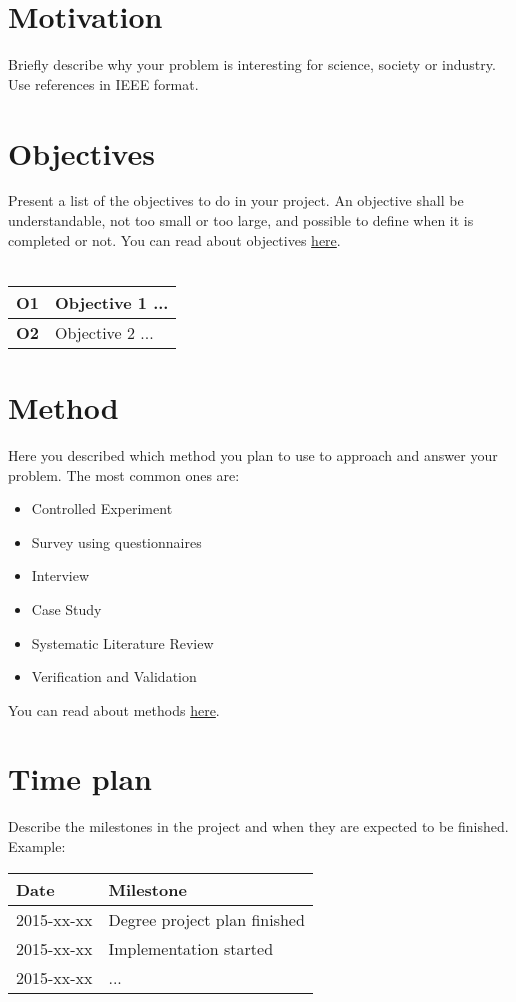 \documentclass[12pt]{article}
\begin{document}
\section*{Motivation}
Briefly describe why your problem is interesting for science, society or industry. Use references in IEEE format\cite{Chalmers:2013,Darwin:1859}.

\section*{Objectives}
Present a list of the objectives to do in your project. An objective shall be understandable, not too small or too large, and possible to define when it is completed or not. You can read about objectives \href{https://coursepress.lnu.se/subject/thesis-projects/objectives/}{here}.\\
\\
\begin{tabular} {|p{1.2cm}|p{11.6cm}|} \hline
\textbf{O1} & Objective 1 ... \\ \hline
\textbf{O2} & Objective 2 ... \\ \hline
\end{tabular}

\section*{Method}
Here you described which method you plan to use to approach and answer your problem. The most common ones are:
\begin{itemize}
\item Controlled Experiment
\item Survey using questionnaires
\item Interview
\item Case Study
\item Systematic Literature Review
\item Verification and Validation 
\end{itemize}

You can read about methods \href{https://coursepress.lnu.se/subject/thesis-projects/method-overview/}{here}.

\section*{Time plan}
Describe the milestones in the project and when they are expected to be finished. Example:
\\
\begin{tabular} {|p{2.6cm}|p{10.2cm}|} \hline
\textbf{Date} & \textbf{Milestone} \\ \hline
2015-xx-xx & Degree project plan finished \\ \hline
2015-xx-xx & Implementation started \\ \hline
2015-xx-xx & ... \\ \hline
\end{tabular}



\end{document}
